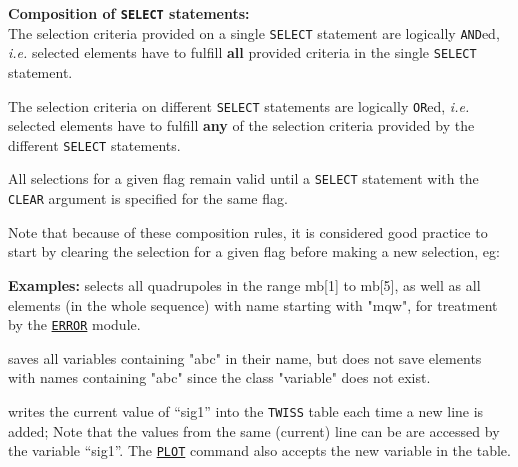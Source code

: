 \vskip 5mm
\textbf{Composition of \texttt{SELECT} statements:} \\
The selection criteria provided on a single \texttt{SELECT} statement
are logically \texttt{AND}ed, \textsl{i.e.} selected elements have to
fulfill \textbf{all} provided criteria in the single \texttt{SELECT}
statement. 

The selection criteria on different \texttt{SELECT} statements are
logically \texttt{OR}ed, \textsl{i.e.} selected elements have to fulfill
\textbf{any} of the selection criteria provided by the different
\texttt{SELECT} statements. 

All selections for a given flag remain valid until a \texttt{SELECT}
statement with the \texttt{CLEAR} argument is specified for the same flag.

Note that because of these composition rules, it is considered good
practice to start by clearing the selection for a given flag before
making a new selection, eg: 


\vskip 5mm
\textbf{Examples:} 
selects all quadrupoles in the range mb[1] to mb[5], as well as all
elements (in the whole sequence) with name starting with "mqw", for 
treatment by the \hyperref[chap:error]{\texttt{ERROR}} module.  

\vskip 5mm
saves all variables containing "abc" in their name,
but does not save elements with names containing "abc" since the class
"variable" does not exist.  

\vskip 5mm
writes the current value of ``sig1'' into the \texttt{TWISS} table each
time a new line is added; Note that the values from the same (current)
line can be are accessed by the variable ``sig1''.
The \hyperref[chap:plot]{\texttt{PLOT}} command also accepts the new variable 
in the table.  



